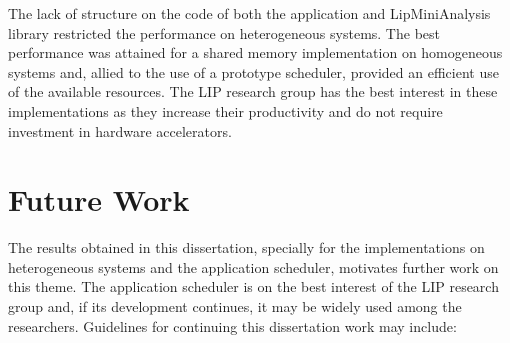 The lack of structure on the code of both the application and LipMiniAnalysis library restricted the performance on heterogeneous systems. The best performance was attained for a shared memory implementation on homogeneous systems and, allied to the use of a prototype scheduler, provided an efficient use of the available resources. The LIP research group has the best interest in these implementations as they increase their productivity and do not require investment in hardware accelerators.

\section{Future Work}
\label{FutureWork}

The results obtained in this dissertation, specially for the implementations on heterogeneous systems and the application scheduler, motivates further work on this theme. The application scheduler is on the best interest of the LIP research group and, if its development continues, it may be widely used among the researchers. Guidelines for continuing this dissertation work may include:

